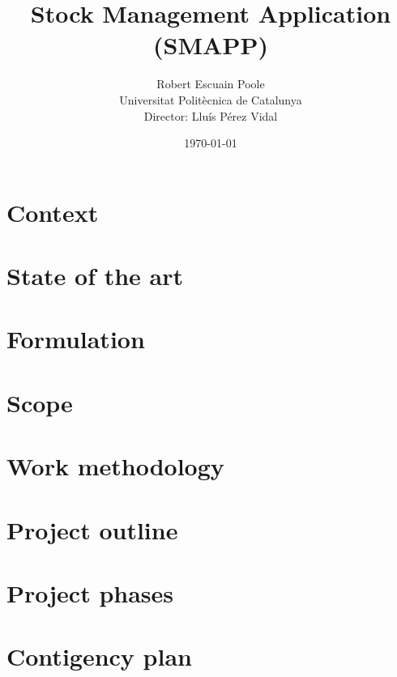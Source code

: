 \documentclass{report}
\begin{document}
    \title{\bfseries Stock Management Application (SMAPP)}
    \author{Robert Escuain Poole\\[\bigskipamount]Universitat Politècnica de Catalunya\\Director: Lluís Pérez Vidal}
    \date{\today}
    \maketitle

    \tableofcontents

    \chapter{Context}
    
    
    \chapter{State of the art}
    
    
    \chapter{Formulation}
    
    
    \chapter{Scope}
    
    
    \chapter{Work methodology}
    
    
    \chapter{Project outline}
    
    
    \chapter{Project phases}
    
    
    \chapter{Contigency plan}
    
    
\end{document}
